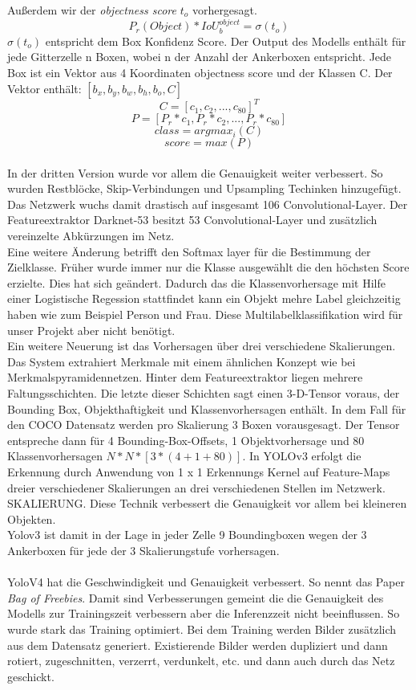 \documentclass[conference]{IEEEtran}
\begin{document}
	Außerdem wir der \textit{objectness score} $t_o$ vorhergesagt.
	\[ P_r(Object)*IoU_{b}^{object} = \sigma(t_o) \]
	$\sigma(t_o)$ entspricht dem Box Konfidenz Score.
	Der Output des Modells enthält für jede Gitterzelle n Boxen, wobei n der Anzahl der Ankerboxen entspricht. Jede Box ist ein Vektor aus 4 Koordinaten objectness score und der Klassen C. Der Vektor enthält: $[b_x,b_y,b_w,b_h, b_o, C]$
	\[ C = [c_1, c_2,..., c_{80}]^T\]
	\[ P = [P_r * c_1, P_r * c_2, ..., P_r * c_{80}] \]
	\[ class = argmax_i(C)\]
	\[ score = max(P)\]\\
	In der dritten Version wurde vor allem die Genauigkeit weiter verbessert. So wurden Restblöcke, Skip-Verbindungen und Upsampling Techinken hinzugefügt. Das Netzwerk wuchs damit drastisch auf insgesamt 106 Convolutional-Layer.
	Der Featureextraktor Darknet-53 besitzt 53 Convolutional-Layer und zusätzlich vereinzelte Abkürzungen im Netz.\\
	Eine weitere Änderung betrifft den Softmax layer für die Bestimmung der Zielklasse. Früher wurde immer nur die Klasse ausgewählt die den höchsten Score erzielte. Dies hat sich geändert. Dadurch das die Klassenvorhersage mit Hilfe einer Logistische Regession stattfindet kann ein Objekt mehre Label gleichzeitig haben wie zum Beispiel Person und Frau. Diese Multilabelklassifikation wird für unser Projekt aber nicht benötigt.\\
	Ein weitere Neuerung ist das Vorhersagen über drei verschiedene Skalierungen. Das System extrahiert Merkmale mit einem ähnlichen Konzept wie bei Merkmalspyramidennetzen. Hinter dem Featureextraktor liegen mehrere Faltungsschichten. Die letzte dieser Schichten sagt einen 3-D-Tensor voraus, der Bounding Box, Objekthaftigkeit und Klassenvorhersagen enthält. In dem Fall für den COCO Datensatz werden pro Skalierung 3 Boxen vorausgesagt. Der Tensor entspreche dann für 4 Bounding-Box-Offsets, 1 Objektvorhersage und 80 Klassenvorhersagen $N*N*[3*(4 + 1 + 80)]$. In YOLOv3 erfolgt die Erkennung durch Anwendung von 1 x 1 Erkennungs Kernel auf Feature-Maps dreier verschiedener Skalierungen an drei verschiedenen Stellen im Netzwerk. SKALIERUNG. Diese Technik verbessert die Genauigkeit vor allem bei kleineren Objekten.\\
	Yolov3 ist damit in der Lage in jeder Zelle 9 Boundingboxen wegen der 3 Ankerboxen für jede der 3 Skalierungstufe vorhersagen.\cite{b4}\\
	\\
	YoloV4 hat die Geschwindigkeit und Genauigkeit verbessert. So nennt das Paper \cite{b2} \textit{Bag of Freebies}. Damit sind Verbesserungen gemeint die die Genauigkeit des Modells zur Trainingszeit verbessern aber die Inferenzzeit nicht beeinflussen. So wurde stark das Training optimiert. Bei dem Training werden Bilder zusätzlich aus dem Datensatz generiert. Existierende Bilder werden dupliziert und dann rotiert, zugeschnitten, verzerrt, verdunkelt, etc. und dann auch durch das Netz geschickt. 
\end{document}
